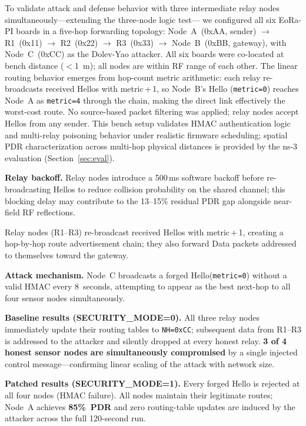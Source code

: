 \documentclass[preprint,12pt]{elsarticle}
\begin{document}
To validate attack and defense behavior with three intermediate
relay nodes simultaneously—extending the three-node logic test—
we configured all six EoRa-PI boards in a five-hop forwarding
topology:
Node~A~(0xAA, sender) $\to$ R1~(0x11) $\to$ R2~(0x22) $\to$
R3~(0x33) $\to$ Node~B~(0xBB, gateway), with Node~C~(0xCC)
as the Dolev-Yao attacker.
All six boards were co-located at bench distance ($<$1~m); all nodes are within RF range of each other.
The linear routing behavior emerges from hop-count metric arithmetic: each relay re-broadcasts received Hellos with metric\,+\,1, so Node~B's Hello (\texttt{metric=0}) reaches Node~A as \texttt{metric=4} through the chain, making the direct link effectively the worst-cost route.
No source-based packet filtering was applied; relay nodes accept Hellos from any sender.
This bench setup validates HMAC authentication logic and multi-relay poisoning behavior under realistic firmware scheduling; spatial PDR characterization across multi-hop physical distances is provided by the ns-3 evaluation (Section~\ref{sec:eval}).

\textbf{Relay backoff.}
Relay nodes introduce a 500\,ms software backoff before re-broadcasting Hellos to reduce collision probability on the shared channel; this blocking delay may contribute to the 13--15\% residual PDR gap alongside near-field RF reflections.

Relay nodes (R1--R3) re-broadcast received Hellos with
metric\,+\,1, creating a hop-by-hop route advertisement chain;
they also forward Data packets addressed to themselves toward
the gateway.

\textbf{Attack mechanism.}
Node~C broadcasts a forged Hello(\texttt{metric=0}) without a
valid HMAC every 8~seconds, attempting to appear as the best
next-hop to all four sensor nodes simultaneously.

\textbf{Baseline results (SECURITY\_MODE=0).}
All three relay nodes immediately update their routing tables to
\texttt{NH=0xCC}; subsequent data from R1--R3 is addressed to the
attacker and silently dropped at every honest relay.
\textbf{3 of 4 honest sensor nodes are simultaneously compromised}
by a single injected control message—confirming linear scaling
of the attack with network size.

\textbf{Patched results (SECURITY\_MODE=1).}
Every forged Hello is rejected at all four nodes (HMAC failure).
All nodes maintain their legitimate routes; Node~A achieves
\textbf{85\%~PDR} and zero routing-table updates are induced
by the attacker across the full 120-second run.
\end{document}
